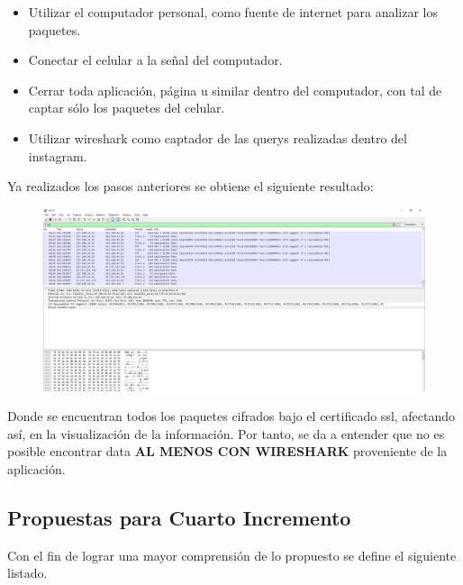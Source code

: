 \documentclass[a4paper,11pt]{article}
\theoremstyle{mytheor}
\begin{document}
\begin{itemize}
    \begin{itemize}
        \item Utilizar el computador personal, como fuente de internet para analizar los paquetes.
        \item Conectar el celular a la señal del computador.
        \item Cerrar toda aplicación, página u similar dentro del computador, con tal de captar sólo los paquetes del celular.
        \item Utilizar wireshark como captador de las querys realizadas dentro del instagram.
    \end{itemize}
    
    Ya realizados los pasos anteriores se obtiene el siguiente resultado:
    
    
           
     \begin{figure}[!h]
    \centering
    \includegraphics[scale=0.2]{wireshark.png}
    \label{fig:my_label}
    \end{figure}
    
    Donde se encuentran todos los paquetes cifrados bajo el certificado ssl, afectando así, en la visualización de la información. Por tanto, se da a entender que no es posible encontrar data \textbf{AL MENOS CON WIRESHARK} proveniente de la aplicación.
    
    
    
    
    
    
\end{itemize}


\subsection{Propuestas para Cuarto Incremento}

Con el fin de lograr una mayor comprensión de lo propuesto se define el siguiente listado.
\end{document}
